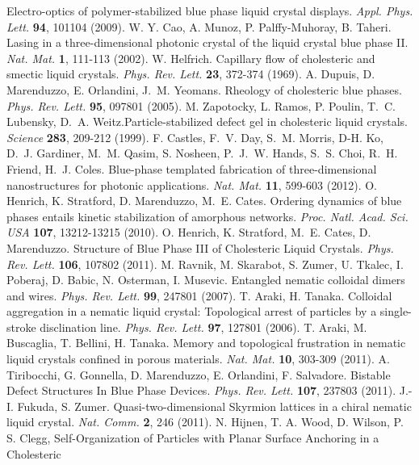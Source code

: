 \documentclass[12pt]{article}
\begin{document}
\begin{thebibliography}{99}
 Electro-optics of polymer-stabilized blue phase liquid crystal displays.
{\it Appl. Phys. Lett.} {\bf 94}, 101104 (2009).
 W. Y. Cao, A. Munoz, P. Palffy-Muhoray, B. Taheri.
Lasing in a three-dimensional photonic crystal of the liquid crystal blue 
phase II. {\it Nat. Mat.} {\bf 1}, 111-113 (2002).
 	W. Helfrich. Capillary flow of cholesteric
and smectic liquid crystals. {\it Phys. Rev. Lett.} {\bf 23}, 372-374 (1969).
 A. Dupuis, D. Marenduzzo, E. Orlandini, J.~M. Yeomans.
Rheology of cholesteric blue phases. {\it Phys. Rev. Lett.} {\bf 95},
097801 (2005).
 M. Zapotocky, L. Ramos, P. Poulin, T.~C. Lubensky, 
D.~A. Weitz.Particle-stabilized defect gel in cholesteric liquid crystals.  {\it Science} {\bf 283}, 209-212 (1999).
 F. Castles, F.~V. Day, S.~M. Morris, D-H. Ko, D.~J. Gardiner, M.~M. Qasim, S. Nosheen, P.~J.~W. Hands, S.~S. Choi, R.~H. Friend, H.~J. Coles.
Blue-phase templated fabrication of three-dimensional nanostructures for photonic applications. {\it Nat. Mat.} {\bf 11}, 599-603 (2012).
 O. Henrich, K. Stratford, D. Marenduzzo, M.~E. Cates.
 Ordering dynamics of blue phases entails kinetic stabilization of amorphous networks. {\it Proc. Natl. Acad. Sci. USA} {\bf 107}, 13212-13215 (2010).
 O. Henrich, K. Stratford, M.~E. Cates, D. Marenduzzo.
 Structure of Blue Phase III of Cholesteric Liquid Crystals.
{\it Phys. Rev. Lett.} {\bf 106}, 107802 (2011).
 M. Ravnik, M. Skarabot, S. Zumer, U. Tkalec, I. Poberaj, D. Babic, N. Osterman, I. Musevic.  Entangled nematic colloidal dimers and wires. 
{\it Phys. Rev. Lett.} {\bf 99}, 247801 (2007).
 T. Araki, H. Tanaka.  Colloidal aggregation in a nematic liquid crystal: Topological arrest of particles by a single-stroke disclination line. {\it Phys. Rev. Lett.} {\bf 97}, 127801 (2006).
 T. Araki, M. Buscaglia, T. Bellini, H. Tanaka.
Memory and topological frustration in nematic liquid crystals confined in porous materials. {\it Nat. Mat.} {\bf 10}, 303-309 (2011).
 A. Tiribocchi, G. Gonnella, D. Marenduzzo, E. Orlandini,
F. Salvadore. Bistable Defect Structures In Blue Phase Devices. 
 {\it Phys. Rev. Lett.} {\bf 107}, 237803 (2011).
 J.-I. Fukuda, S. Zumer.
Quasi-two-dimensional Skyrmion lattices in a chiral nematic liquid crystal. 
{\it Nat. Comm.} {\bf 2}, 246 (2011).
 N. Hijnen, T. A. Wood, D. Wilson, P. S. Clegg, 
Self-Organization of Particles with Planar Surface Anchoring in a Cholesteric

\end{thebibliography}
\end{document}
